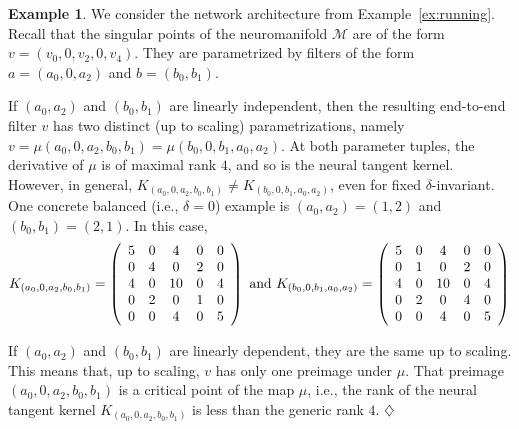\documentclass[twoside]{article}
\theoremstyle{definition}
\newtheorem{example}[theorem]{Example}
\theoremstyle{remark}
\begin{document}
\begin{example}\label{ex:singular}
We consider the network architecture from Example~\ref{ex:running}.
Recall that the singular points of the neuromanifold $\mathcal{M}$ are of the form $v = (v_0,0,v_2,0,v_4)$.
They are parametrized by filters of the form $a = (a_0,0,a_2)$ and $b=(b_0,b_1)$.

    
    If $(a_0,a_2)$ and $(b_0,b_1)$ are linearly independent, 
    then the resulting end-to-end filter $v$ has two distinct (up to scaling) parametrizations, namely
    $v = \mu(a_0,0,a_2,b_0,b_1) = \mu(b_0,0,b_1,a_0,a_2)$.
    At both parameter tuples, the derivative of $\mu$ is of maximal rank $4$, and so is the neural tangent kernel.
    However, in general, $K_{(a_0,0,a_2,b_0,b_1)} \neq K_{(b_0,0,b_1,a_0,a_2)}$, even for fixed $\delta$-invariant.
    One concrete balanced (i.e., $\delta=0$) example is $(a_0,a_2)=(1,2)$ and $(b_0,b_1)=(2,1)$. In this case, 
    \begin{align*}
        K_{(a_0,0,a_2,b_0,b_1)} = \left( \begin{array}{c c c c c}
         5 & 0 & 4 & 0 & 0 \\
         0 & 4 & 0 & 2 & 0 \\
         4 & 0 & 10 & 0 & 4 \\
         0 & 2 & 0 & 1 & 0 \\
         0 & 0 & 4 & 0 & 5
    \end{array} \right)  \text{ and } 
        K_{(b_0,0,b_1,a_0,a_2)} = \left( \begin{array}{c c c c c}
         5 & 0 & 4 & 0 & 0 \\
         0 & 1 & 0 & 2 & 0 \\
         4 & 0 & 10 & 0 & 4 \\
         0 & 2 & 0 & 4 & 0 \\
         0 & 0 & 4 & 0 & 5
    \end{array} \right)
    \end{align*}
    

    If $(a_0,a_2)$ and $(b_0,b_1)$ are linearly dependent, they are the same up to scaling. This means that, up to scaling, $v$ has only one preimage under $\mu$.
    That preimage  $(a_0,0,a_2,b_0,b_1)$ is a critical point of the map $\mu$, i.e., the rank of the neural tangent kernel $K_{(a_0,0,a_2,b_0,b_1)}$ is less than the generic rank $4$.
    $\hfill \diamondsuit$
\end{example}
\end{document}
